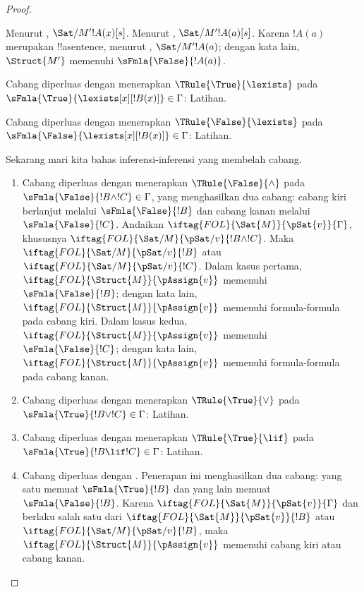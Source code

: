 \documentclass[../../../include/open-logic-section]{subfiles}
\begin{document}
\begin{proof}
\begin{enumerate}
{  Menurut ,
  $\Sat/{M'}{!A(x)}[s]$. Menurut
  , $\Sat/{M'}{!A(a)}[s]$. Karena
  $!A(a)$ merupakan !!a{sentence}, menurut
  , $\Sat/{M'}{!A(a)}$; dengan
  kata lain, $\Struct{M'}$ memenuhi $\sFmla{\False}{!A(a)}$.
\item Cabang diperluas dengan menerapkan $\TRule{\True}{\lexists}$ pada
  $\sFmla{\True}{\lexists[x][!B(x)]} \in \Gamma$: Latihan.
\item Cabang diperluas dengan menerapkan $\TRule{\False}{\lexists}$ pada
  $\sFmla{\False}{\lexists[x][!B(x)]} \in \Gamma$: Latihan.}{}
\end{enumerate}
Sekarang mari kita bahas inferensi-inferensi yang membelah cabang.
\begin{enumerate}
\item Cabang diperluas dengan menerapkan $\TRule{\False}{\land}$ pada
  $\sFmla{\False}{!B \land !C} \in \Gamma$, yang menghasilkan dua
  cabang: cabang kiri berlanjut melalui $\sFmla{\False}{!B}$ dan cabang
  kanan melalui $\sFmla{\False}{!C}$. Andaikan
  $\iftag{FOL}{\Sat{M}}{\pSat{v}}{\Gamma}$, khususnya
  $\iftag{FOL}{\Sat/{M}}{\pSat/{v}}{!B \land !C}$. Maka
  $\iftag{FOL}{\Sat/{M}}{\pSat/{v}}{!B}$ atau
  $\iftag{FOL}{\Sat/{M}}{\pSat/{v}}{!C}$. Dalam kasus pertama,
  $\iftag{FOL}{\Struct{M}}{\pAssign{v}}$ memenuhi
  $\sFmla{\False}{!B}$; dengan kata lain,
  $\iftag{FOL}{\Struct{M}}{\pAssign{v}}$ memenuhi formula-formula pada
  cabang kiri. Dalam kasus kedua,
  $\iftag{FOL}{\Struct{M}}{\pAssign{v}}$ memenuhi
  $\sFmla{\False}{!C}$; dengan kata lain,
  $\iftag{FOL}{\Struct{M}}{\pAssign{v}}$ memenuhi formula-formula pada
  cabang kanan.
\item Cabang diperluas dengan menerapkan $\TRule{\True}{\lor}$ pada
  $\sFmla{\True}{!B \lor !C} \in \Gamma$: Latihan.
\item Cabang diperluas dengan menerapkan $\TRule{\True}{\lif}$ pada
  $\sFmla{\True}{!B \lif !C} \in \Gamma$: Latihan.
\item Cabang diperluas dengan \Cut. Penerapan ini menghasilkan dua
  cabang: yang satu memuat $\sFmla{\True}{!B}$ dan yang lain memuat
  $\sFmla{\False}{!B}$. Karena
  $\iftag{FOL}{\Sat{M}}{\pSat{v}}{\Gamma}$ dan berlaku salah satu dari
  $\iftag{FOL}{\Sat{M}}{\pSat{v}}{!B}$ atau
  $\iftag{FOL}{\Sat/{M}}{\pSat/{v}}{!B}$, maka
  $\iftag{FOL}{\Struct{M}}{\pAssign{v}}$ memenuhi cabang kiri atau
  cabang kanan.
\end{enumerate}
\end{proof}
\end{document}
